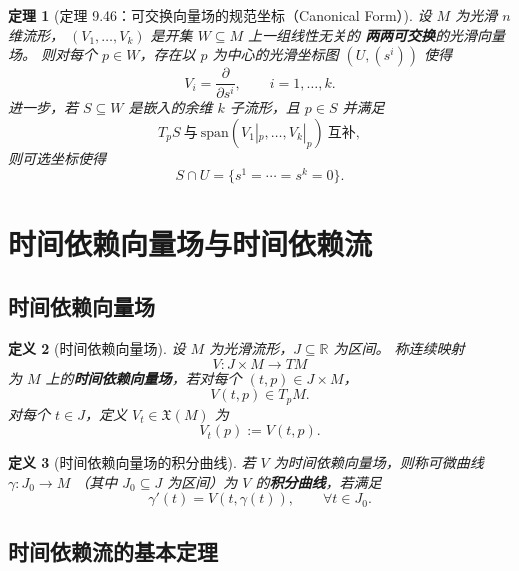 \documentclass[11pt]{article}
\newtheorem{definition}{定义}[section]
\newtheorem{theorem}[definition]{定理}
\newcommand{\R}{\mathbb{R}}
\newcommand{\X}{\mathfrak{X}}
\begin{document}
\begin{theorem}[定理 9.46：可交换向量场的规范坐标（Canonical Form）]
设 $M$ 为光滑 $n$ 维流形，
$(V_1,\dots,V_k)$ 是开集 $W\subseteq M$ 上一组线性无关的
\textbf{两两可交换}的光滑向量场。
则对每个 $p\in W$，存在以 $p$ 为中心的光滑坐标图 $(U,(s^i))$ 使得
\[
V_i=\frac{\partial}{\partial s^i},\qquad i=1,\dots,k.
\]
进一步，若 $S\subseteq W$ 是嵌入的余维 $k$ 子流形，且 $p\in S$ 并满足
\[
T_pS\ \text{与}\ \mathrm{span}(V_1|_p,\dots,V_k|_p)\ \text{互补},
\]
则可选坐标使得
\[
S\cap U=\{s^1=\cdots=s^k=0\}.
\]
\end{theorem}

\section{时间依赖向量场与时间依赖流}

\subsection{时间依赖向量场}

\begin{definition}[时间依赖向量场]
设 $M$ 为光滑流形，$J\subseteq\R$ 为区间。
称连续映射
\[
V:J\times M\to TM
\]
为 $M$ 上的\textbf{时间依赖向量场}，若对每个 $(t,p)\in J\times M$，
\[
V(t,p)\in T_pM.
\]
对每个 $t\in J$，定义 $V_t\in\X(M)$ 为
\[
V_t(p):=V(t,p).
\]
\end{definition}

\begin{definition}[时间依赖向量场的积分曲线]
若 $V$ 为时间依赖向量场，则称可微曲线 $\gamma:J_0\to M$
（其中 $J_0\subseteq J$ 为区间）为 $V$ 的\textbf{积分曲线}，若满足
\[
\gamma'(t)=V(t,\gamma(t)),\qquad \forall t\in J_0.
\]
\end{definition}

\subsection{时间依赖流的基本定理}
\end{document}

